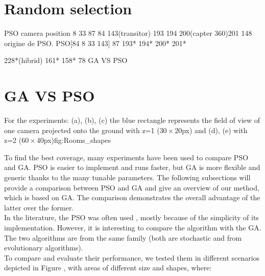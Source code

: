 \section{Random selection }
PSO camera position 
8 33 87 84 143(transitor) 193 194 200(capter 360)201
148 origine de PSO. 
PSO[84 8 33 143] 87 193* 194* 200* 201* 

228*(hibrid) 161* 158* 78 GA VS PSO

\section{GA VS PSO }\label{sec:GAvsPSO} 
%

\begin{mfigures}{For the experiments: (a), (b), (c) the blue rectangle represents the field of view of one camera projected onto the ground  with z=1 ($30 \times 20 $px) and (d), (e) with z=2 ($60 \times 40 $px)}{fig:Rooms_shapes} \centering
{}
\hspace{1cm}
\hspace{1cm}
\end{mfigures}

To find the best coverage, many experiments have been used to compare PSO and GA. PSO is easier to implement and runs faster, but GA is more flexible and generic thanks to the many tunable parameters. 
The following subsections will provide a comparison between PSO and GA and give an overview of our method, which is based on GA. The comparison demonstrates the overall advantage of the latter over the former.\\
In the literature, the PSO was often used \cite{8*zhou2011,33*reddy2012}, mostly because of the simplicity of its implementation. However, it is interesting to compare the algorithm with the GA. The two algorithms are from the same family (both are stochastic and from evolutionary algorithms).\\
To compare and evaluate their performance, we tested them in different scenarios depicted in Figure , with areas  of different size and shapes, where: 




